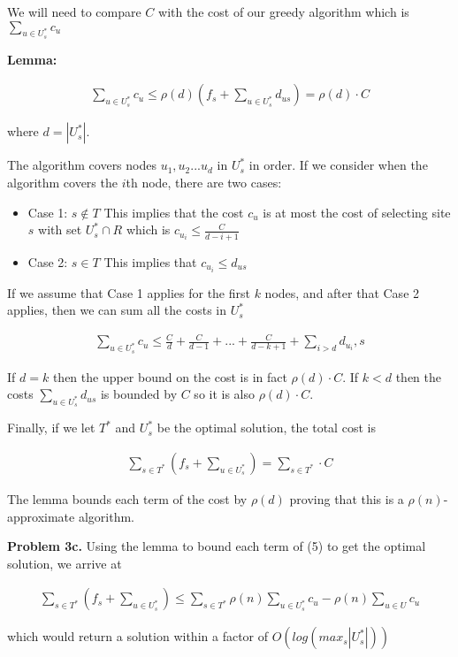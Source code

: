 \documentclass{article}
\begin{document}
We will need to compare $C$ with the cost of our greedy algorithm which is $\sum_{u \in U_s^*}c_u$

\hfill

\textbf{Lemma:}

\begin{gather}
    \sum_{u \in U_s^*}c_u \leq \rho(d)(f_s + \sum_{u \in U_s^*}d_{us}) = \rho(d) \cdot C
\end{gather}

where $d = |U_s^*|$.

\hfill
The algorithm covers nodes $u_1, u_2...u_d$ in $U_s^*$ in order. If we consider when the algorithm covers the $i$th node, there are two cases:

\begin{itemize}
    \item Case 1: $s \notin T$
        \subitem This implies that the cost $c_u$ is at most the cost of selecting site $s$ with set $U_s^* \cap R$ which is $c_{u_i} \leq \frac{C}{d-i+1}$
    \item Case 2: $s \in T$
        \subitem This implies that $c_{u_i} \leq d_{us}$
\end{itemize}

\hfill

If we assume that Case 1 applies for the first $k$ nodes, and after that Case 2 applies, then we can sum all the costs in $U_s^*$

\begin{gather}
    \sum_{u \in U_s^*} c_u \leq \frac{C}{d} + \frac{C}{d-1} + ... + \frac{C}{d-k+1} + \sum_{i > d}d_{u_i}, s
\end{gather}

If $d=k$ then the upper bound on the cost is in fact $\rho(d) \cdot C$. If $k < d$ then the costs $\sum_{u \in U_s^*}d_{us}$ is bounded by $C$ so it is also $\rho(d) \cdot C$.

Finally, if we let $T^*$ and $U_s^*$ be the optimal solution, the total cost is

\begin{gather}
    \sum_{s \in T^*} (f_s + \sum_{u \in U_s^*}) = \sum_{s \in T^*} \cdot C
\end{gather}

The lemma bounds each term of the cost by $\rho(d)$ proving that this is a $\rho(n)$-approximate algorithm.

\hfill

\textbf{Problem 3c.} Using the lemma to bound each term of (5) to get the optimal solution, we arrive at 

\begin{gather}
    \sum_{s \in T^*} (f_s + \sum_{u \in U_s^*}) \leq \sum_{s \in T^*} \rho(n) \sum_{u \in U_s^*} c_u - \rho(n) \sum_{u \in U} c_u
\end{gather}

which would return a solution within a factor of $O(log(max_s |U_s^*|))$

\newpage
 

\end{document}
